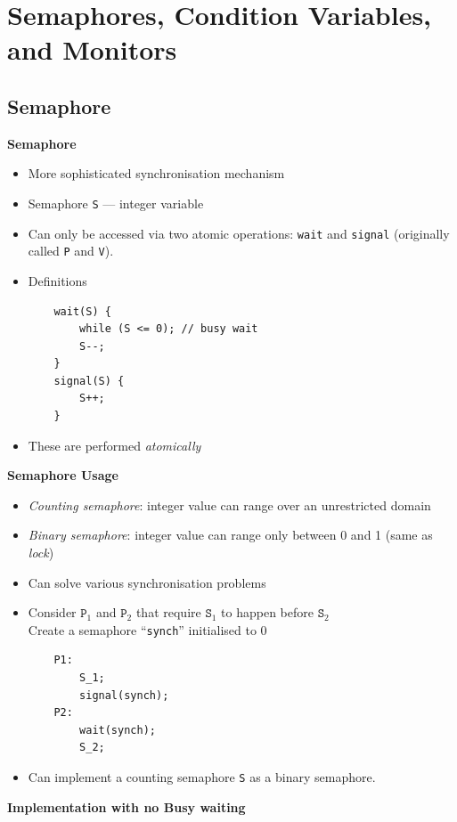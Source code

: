 \documentclass[11pt,a4paper]{article}
\begin{document}
\section{Semaphores, Condition Variables, and Monitors}

\subsection{Semaphore}

\textbf{Semaphore}
\begin{itemize}
    \item More sophisticated synchronisation mechanism
    \item Semaphore \texttt{S} --- integer variable
    \item Can only be accessed via two atomic operations: \texttt{wait} and \texttt{signal}
        (originally called \texttt{P} and \texttt{V}).
    \item Definitions
        \begin{verbatim}
    wait(S) {
        while (S <= 0); // busy wait
        S--;
    }
    signal(S) {
        S++;
    }
        \end{verbatim}
    \item These are performed \emph{atomically}
\end{itemize}

\textbf{Semaphore Usage}
\begin{itemize}
    \item \emph{Counting semaphore}: integer value can range over an unrestricted domain
    \item \emph{Binary semaphore}: integer value can range only between 0 and 1
        (same as \emph{lock})
    \item Can solve various synchronisation problems
    \item Consider $\texttt{P}_1$ and $\texttt{P}_2$ that require $\texttt{S}_1$ to
        happen before $\texttt{S}_2$ \\
        Create a semaphore ``\texttt{synch}'' initialised to 0
        \begin{verbatim}
    P1:
        S_1;
        signal(synch);
    P2:
        wait(synch);
        S_2;
        \end{verbatim}
    \item Can implement a counting semaphore \texttt{S} as a binary semaphore.
\end{itemize}

\textbf{Implementation with no Busy waiting}
\end{document}
